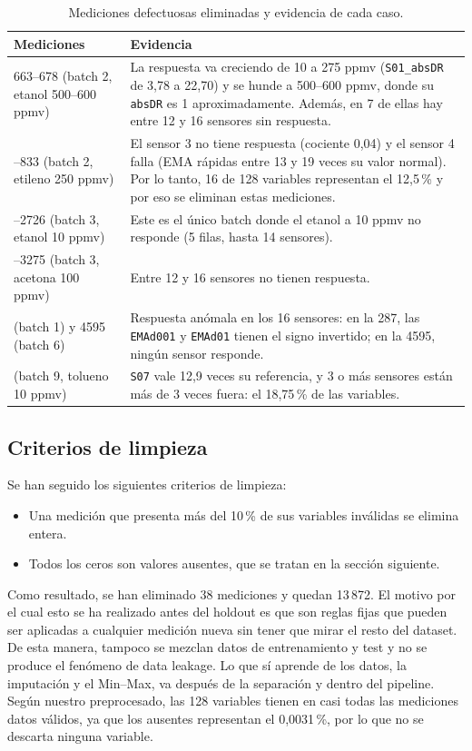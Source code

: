 \begin{table}[H]
\centering
\caption{Mediciones defectuosas eliminadas y evidencia de cada caso.}
\label{tab:defectuosas}
\begin{tabular}{p{4.2cm}p{10.3cm}}
\toprule
Mediciones & Evidencia \\
\midrule
663--678 (batch 2, etanol 500--600 ppmv) &
La respuesta va creciendo de 10 a 275 ppmv (\texttt{S01\_absDR} de 3,78 a 22,70) y se hunde a
500--600 ppmv, donde su \texttt{absDR} es 1 aproximadamente. Además, en 7 de ellas hay entre 12 y
16 sensores sin respuesta. \\
\addlinespace
825--833 (batch 2, etileno 250 ppmv) &
El sensor 3 no tiene respuesta (cociente 0,04) y el sensor 4 falla (EMA rápidas entre 13 y 19 veces
su valor normal). Por lo tanto, 16 de 128 variables representan el 12,5\,\% y por eso se eliminan
estas mediciones. \\
\addlinespace
2722--2726 (batch 3, etanol 10 ppmv) &
Este es el único batch donde el etanol a 10 ppmv no responde (5 filas, hasta 14 sensores). \\
\addlinespace
3271--3275 (batch 3, acetona 100 ppmv) &
Entre 12 y 16 sensores no tienen respuesta. \\
\addlinespace
287 (batch 1) y 4595 (batch 6) &
Respuesta anómala en los 16 sensores: en la 287, las \texttt{EMAd001} y \texttt{EMAd01} tienen el
signo invertido; en la 4595, ningún sensor responde. \\
\addlinespace
9894 (batch 9, tolueno 10 ppmv) &
\texttt{S07} vale 12,9 veces su referencia, y 3 o más sensores están más de 3 veces fuera: el
18,75\,\% de las variables. \\
\bottomrule
\end{tabular}
\end{table}

\subsection{Criterios de limpieza}
\label{sec:limpieza}

Se han seguido los siguientes criterios de limpieza:
\begin{itemize}
  \item Una medición que presenta más del 10\,\% de sus variables inválidas se elimina entera.
  \item Todos los ceros son valores ausentes, que se tratan en la sección siguiente.
\end{itemize}
Como resultado, se han eliminado 38 mediciones y quedan 13\,872. El motivo por el cual esto se ha
realizado antes del holdout es que son reglas fijas que pueden ser aplicadas a cualquier medición
nueva sin tener que mirar el resto del dataset. De esta manera, tampoco se mezclan datos de
entrenamiento y test y no se produce el fenómeno de data leakage. Lo que sí aprende de los datos,
la imputación y el Min--Max, va después de la separación y dentro del pipeline. Según nuestro
preprocesado, las 128 variables tienen en casi todas las mediciones datos válidos, ya que los
ausentes representan el 0,0031\,\%, por lo que no se descarta ninguna variable.

